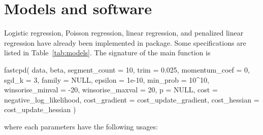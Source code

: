 \documentclass[article]{jss}\usepackage[]{graphicx}\usepackage[]{xcolor}
\newcommand{\fct}[1]{\code{#1()}}
\begin{document}

\section{Models and software} \label{sec:models}

Logistic regression, Poisson regression, linear regression, and penalized
linear regression have already been implemented in  package. Some
specifications are listed in Table~\ref{tab:models}. The signature of the main
function \fct{fastcpd} is
%
\begin{Code}
fastcpd(
  data,
  beta,
  segment_count = 10,
  trim = 0.025,
  momentum_coef = 0,
  sgd_k = 3,
  family = NULL,
  epsilon = 1e-10,
  min_prob = 10^10,
  winsorise_minval = -20,
  winsorise_maxval = 20,
  p = NULL,
  cost = negative_log_likelihood,
  cost_gradient = cost_update_gradient,
  cost_hessian = cost_update_hessian
)
\end{Code}
%
where each parameters have the following usages:
\end{document}
